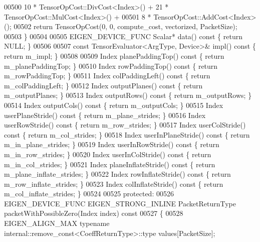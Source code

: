 \begin{DoxyCode}
00500         10 * TensorOpCost::DivCost<Index>() + 21 * TensorOpCost::MulCost<Index>() +
00501         8 * TensorOpCost::AddCost<Index>();
00502     \textcolor{keywordflow}{return} TensorOpCost(0, 0, compute\_cost, vectorized, PacketSize);
00503   \}
00504 
00505   EIGEN\_DEVICE\_FUNC Scalar* data()\textcolor{keyword}{ const }\{ \textcolor{keywordflow}{return} NULL; \}
00506 
00507   \textcolor{keyword}{const} TensorEvaluator<ArgType, Device>& impl()\textcolor{keyword}{ const }\{ \textcolor{keywordflow}{return} m\_impl; \}
00508 
00509   Index planePaddingTop()\textcolor{keyword}{ const }\{ \textcolor{keywordflow}{return} m\_planePaddingTop; \}
00510   Index rowPaddingTop()\textcolor{keyword}{ const }\{ \textcolor{keywordflow}{return} m\_rowPaddingTop; \}
00511   Index colPaddingLeft()\textcolor{keyword}{ const }\{ \textcolor{keywordflow}{return} m\_colPaddingLeft; \}
00512   Index outputPlanes()\textcolor{keyword}{ const }\{ \textcolor{keywordflow}{return} m\_outputPlanes; \}
00513   Index outputRows()\textcolor{keyword}{ const }\{ \textcolor{keywordflow}{return} m\_outputRows; \}
00514   Index outputCols()\textcolor{keyword}{ const }\{ \textcolor{keywordflow}{return} m\_outputCols; \}
00515   Index userPlaneStride()\textcolor{keyword}{ const }\{ \textcolor{keywordflow}{return} m\_plane\_strides; \}
00516   Index userRowStride()\textcolor{keyword}{ const }\{ \textcolor{keywordflow}{return} m\_row\_strides; \}
00517   Index userColStride()\textcolor{keyword}{ const }\{ \textcolor{keywordflow}{return} m\_col\_strides; \}
00518   Index userInPlaneStride()\textcolor{keyword}{ const }\{ \textcolor{keywordflow}{return} m\_in\_plane\_strides; \}
00519   Index userInRowStride()\textcolor{keyword}{ const }\{ \textcolor{keywordflow}{return} m\_in\_row\_strides; \}
00520   Index userInColStride()\textcolor{keyword}{ const }\{ \textcolor{keywordflow}{return} m\_in\_col\_strides; \}
00521   Index planeInflateStride()\textcolor{keyword}{ const }\{ \textcolor{keywordflow}{return} m\_plane\_inflate\_strides; \}
00522   Index rowInflateStride()\textcolor{keyword}{ const }\{ \textcolor{keywordflow}{return} m\_row\_inflate\_strides; \}
00523   Index colInflateStride()\textcolor{keyword}{ const }\{ \textcolor{keywordflow}{return} m\_col\_inflate\_strides; \}
00524 
00525  \textcolor{keyword}{protected}:
00526   EIGEN\_DEVICE\_FUNC EIGEN\_STRONG\_INLINE PacketReturnType packetWithPossibleZero(Index index)\textcolor{keyword}{ const}
00527 \textcolor{keyword}{  }\{
00528     EIGEN\_ALIGN\_MAX \textcolor{keyword}{typename} internal::remove\_const<CoeffReturnType>::type values[PacketSize];

\end{DoxyCode}
